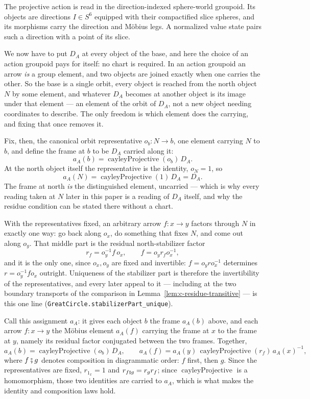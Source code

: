 \documentclass[11pt]{article}
\theoremstyle{plain}
\theoremstyle{definition}
\theoremstyle{remark}
\begin{document}
\begin{tcolorbox}
The projective action is read in the direction-indexed sphere-world groupoid. Its objects are
directions $I\in S^6$ equipped with their compactified slice spheres, and its morphisms carry the
direction and M\"obius legs. A normalized value state pairs such a direction with a point of its
slice.

We now have to put $D_A$ at every object of the base, and here the choice of an
action groupoid pays for itself: no chart is required. In an action groupoid an
arrow \emph{is} a group element, and two objects are joined exactly when one
carries the other. So the base is a single orbit, every object is reached from
the north object $N$ by some element, and whatever $D_A$ becomes at another
object is its image under that element --- an element of the orbit of $D_A$,
not a new object needing coordinates to describe. The only freedom is which
element does the carrying, and fixing that once removes it.

Fix, then, the canonical orbit representative $o_b:N\to b$, one element carrying
$N$ to $b$, and define the frame at $b$ to be $D_A$ carried along it:
\[
  a_A(b)=\operatorname{cayleyProjective}(o_b)\,D_A .
\]
At the north object itself the representative is the identity, $o_N=1$, so
\[
  a_A(N)=\operatorname{cayleyProjective}(1)\,D_A=D_A .
\]
The frame at north \emph{is} the distinguished element, uncarried --- which is
why every reading taken at $N$ later in this paper is a reading of $D_A$ itself,
and why the residue condition can be stated there without a chart.

With the representatives fixed, an arbitrary arrow $f:x\to y$ factors through
$N$ in exactly one way: go back along $o_x$, do something that fixes $N$, and
come out along $o_y$. That middle part is the residual north-stabilizer factor
\[
  r_f=o_y^{-1}f\,o_x,\qquad
  f=o_y r_f o_x^{-1},
\]
and it is the only one, since $o_x,o_y$ are fixed and invertible: $f=o_yro_x^{-1}$
determines $r=o_y^{-1}fo_x$ outright. Uniqueness of the stabilizer part is
therefore the invertibility of the representatives, and every later appeal to it
--- including at the two boundary transports of the comparison in
Lemma~\ref{lem:c-residue-transitive} --- is this one line
\textup{(}\texttt{GreatCircle.stabilizerPart\_unique}\textup{)}.

Call this assignment $a_A$: it gives each object $b$ the frame $a_A(b)$ above,
and each arrow $f:x\to y$ the M\"obius element $a_A(f)$ carrying the frame at
$x$ to the frame at $y$, namely its residual factor conjugated between the two
frames. Together,
\[
  a_A(b)=\operatorname{cayleyProjective}(o_b)\,D_A,\qquad
  a_A(f)=a_A(y)\,\operatorname{cayleyProjective}(r_f)\,a_A(x)^{-1},
                              \tag{OS}\label{eq:orbit-stabilizer}
\]
where $f\fatsemi g$ denotes composition in diagrammatic order: $f$ first, then
$g$. Since the representatives are fixed, $r_{1_x}=1$ and
$r_{f\fatsemi g}=r_g r_f$; since $\operatorname{cayleyProjective}$ is a
homomorphism, those two identities are carried to $a_A$, which is what makes
the identity and composition laws hold.


\end{tcolorbox}
\end{document}
